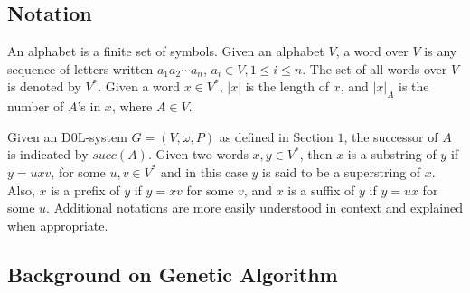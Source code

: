 \documentclass{llncs}
\begin{document}
	\subsection{Notation}
	
	An alphabet is a finite set of symbols. Given an alphabet $V$, a word over $V$ is any sequence of letters written $a_{1}a_{2}\cdots a_{n}$, $a_{i}  \in V, 1 \leq i \leq n$. The set of all words over $V$ is denoted by $V^{*}$. Given a word $x \in V^{*}$, $|x|$ is the length of $x$, and $|x|_{A}$ is the number of $A$'s in $x$, where $A \in V$.
	
	Given an D0L-system $G=(V,\omega,P)$ as defined in Section $1$, the successor of $A$ is indicated by $succ(A)$. Given two words $x,y \in V^{*}$, then $x$ is a substring of $y$ if $y = uxv$, for some $u,v \in V^{*}$ and in this case $y$ is said to be a superstring of $x$. Also, $x$ is a prefix of $y$ if $y=xv$ for some $v$, and $x$ is a suffix of $y$ if $y=ux$ for some $u$. Additional notations are more easily understood in context and explained when appropriate.
	
	\subsection{Background on Genetic Algorithm}
	
\end{document}
